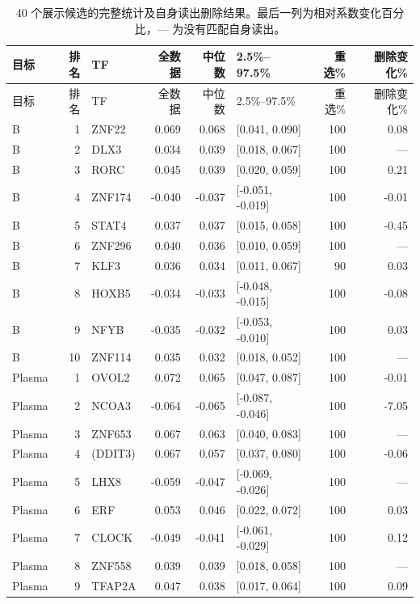 {\footnotesize\linespread{1}\selectfont\setlength{\tabcolsep}{4pt}\renewcommand{\arraystretch}{1.08}\begin{longtable}{lrlrrlrr}\caption{40 个展示候选的完整统计及自身读出删除结果。最后一列为相对系数变化百分比，--- 为没有匹配自身读出。}\\\toprule 目标 & 排名 & TF & 全数据 & 中位数 & 2.5\%–97.5\% & 重选\% & 删除变化\%\\\midrule\endfirsthead\toprule 目标 & 排名 & TF & 全数据 & 中位数 & 2.5\%–97.5\% & 重选\% & 删除变化\%\\\midrule\endhead
B & 1 & ZNF22 & 0.069 & 0.068 & [0.041, 0.090] & 100 & 0.08\\
B & 2 & DLX3 & 0.034 & 0.039 & [0.018, 0.067] & 100 & ---\\
B & 3 & RORC & 0.045 & 0.039 & [0.020, 0.059] & 100 & 0.21\\
B & 4 & ZNF174 & -0.040 & -0.037 & [-0.051, -0.019] & 100 & -0.01\\
B & 5 & STAT4 & 0.037 & 0.037 & [0.015, 0.058] & 100 & -0.45\\
B & 6 & ZNF296 & 0.040 & 0.036 & [0.010, 0.059] & 100 & ---\\
B & 7 & KLF3 & 0.036 & 0.034 & [0.011, 0.067] & 90 & 0.03\\
B & 8 & HOXB5 & -0.034 & -0.033 & [-0.048, -0.015] & 100 & -0.08\\
B & 9 & NFYB & -0.035 & -0.032 & [-0.053, -0.010] & 100 & 0.03\\
B & 10 & ZNF114 & 0.035 & 0.032 & [0.018, 0.052] & 100 & ---\\
Plasma & 1 & OVOL2 & 0.072 & 0.065 & [0.047, 0.087] & 100 & -0.01\\
Plasma & 2 & NCOA3 & -0.064 & -0.065 & [-0.087, -0.046] & 100 & -7.05\\
Plasma & 3 & ZNF653 & 0.067 & 0.063 & [0.040, 0.083] & 100 & ---\\
Plasma & 4 & (DDIT3) & 0.067 & 0.057 & [0.037, 0.080] & 100 & -0.06\\
Plasma & 5 & LHX8 & -0.059 & -0.047 & [-0.069, -0.026] & 100 & ---\\
Plasma & 6 & ERF & 0.053 & 0.046 & [0.022, 0.072] & 100 & 0.03\\
Plasma & 7 & CLOCK & -0.049 & -0.041 & [-0.061, -0.029] & 100 & 0.12\\
Plasma & 8 & ZNF558 & 0.039 & 0.039 & [0.018, 0.058] & 100 & ---\\
Plasma & 9 & TFAP2A & 0.047 & 0.038 & [0.017, 0.064] & 100 & 0.09\\

\end{longtable}}
